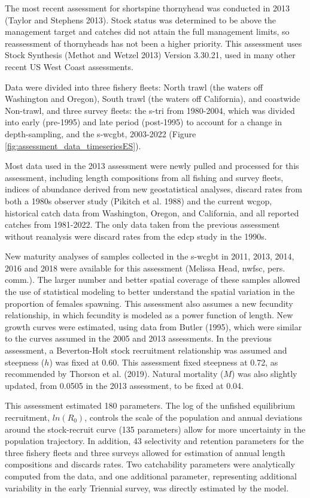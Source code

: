 \documentclass[11pt,
  english,
  letterpaper,
]{article}
\begin{document}
The most recent assessment for shortspine thornyhead was conducted in 2013 (Taylor and Stephens 2013). Stock status was determined to be above the management target and catches did not attain the full management limits, so reassessment of thornyheads has not been a higher priority. This assessment uses Stock Synthesis (Methot and Wetzel 2013) Version 3.30.21, used in many other recent US West Coast assessments.

Data were divided into three fishery fleets: North trawl (the waters off Washington and Oregon), South trawl (the waters off California), and coastwide Non-trawl, and three survey fleets: the \gls{s-tri} from 1980-2004, which was divided into early (pre-1995) and late period (post-1995) to account for a change in depth-sampling, and the \gls{s-wcgbt}, 2003-2022 (Figure \ref{fig:assessment_data_timeseriesES}).

Most data used in the 2013 assessment were newly pulled and processed for this assessment, including length compositions from all fishing and survey fleets, indices of abundance derived from new geostatistical analyses, discard rates from both a 1980s observer study (Pikitch et al. 1988) and the current \gls{wcgop}, historical catch data from Washington, Oregon, and California, and all reported catches from 1981-2022. The only data taken from the previous assessment without reanalysis were discard rates from the \gls{edcp} study in the 1990s.

New maturity analyses of samples collected in the \gls{s-wcgbt} in 2011, 2013, 2014, 2016 and 2018 were available for this assessment (Melissa Head, \gls{nwfsc}, pers. comm.). The larger number and better spatial coverage of these samples allowed the use of statistical modeling to better understand the spatial variation in the proportion of females spawning. This assessment also assumes a new fecundity relationship, in which fecundity is modeled as a power function of length. New growth curves were estimated, using data from Butler (1995), which were similar to the curves assumed in the 2005 and 2013 assessments. In the previous assessment, a Beverton-Holt stock recruitment relationship was assumed and steepness (\(h\)) was fixed at 0.60. This assessment fixed steepness at 0.72, as recommended by Thorson et al. (2019). Natural mortality (\(M\)) was also slightly updated, from 0.0505 in the 2013 assessment, to be fixed at 0.04.

This assessment estimated 180 parameters. The log of the unfished equilibrium recruitment, \(ln(R_0)\), controls the scale of the population and annual deviations around the stock-recruit curve (135 parameters) allow for more uncertainty in the population trajectory. In addition, 43 selectivity and retention parameters for the three fishery fleets and three surveys allowed for estimation of annual length compositions and discards rates. Two catchability parameters were analytically computed from the data, and one additional parameter, representing additional variability in the early Triennial survey, was directly estimated by the model.
\end{document}
